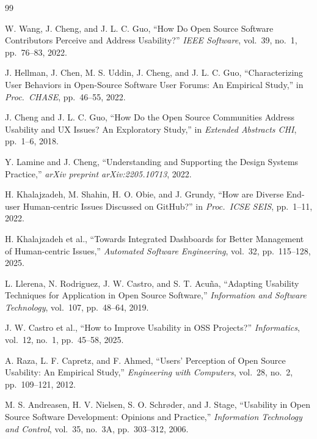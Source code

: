 \documentclass{article}
\begin{document}
\begin{thebibliography}{99}


W. Wang, J. Cheng, and J. L. C. Guo,
``How Do Open Source Software Contributors Perceive and Address Usability?''
\textit{IEEE Software}, vol.~39, no.~1, pp.~76--83, 2022.

J. Hellman, J. Chen, M. S. Uddin, J. Cheng, and J. L. C. Guo,
``Characterizing User Behaviors in Open-Source Software User Forums:
An Empirical Study,''
in \textit{Proc.\ CHASE}, pp.~46--55, 2022.

J. Cheng and J. L. C. Guo,
``How Do the Open Source Communities Address Usability and UX Issues?
An Exploratory Study,''
in \textit{Extended Abstracts CHI}, pp.~1--6, 2018.

Y. Lamine and J. Cheng,
``Understanding and Supporting the Design Systems Practice,''
\textit{arXiv preprint arXiv:2205.10713}, 2022.

H. Khalajzadeh, M. Shahin, H. O. Obie, and J. Grundy,
``How are Diverse End-user Human-centric Issues Discussed on GitHub?''
in \textit{Proc.\ ICSE SEIS}, pp.~1--11, 2022.

H. Khalajzadeh et al.,
``Towards Integrated Dashboards for Better Management of Human-centric Issues,''
\textit{Automated Software Engineering}, vol.~32, pp.~115--128, 2025.

L. Llerena, N. Rodriguez, J. W. Castro, and S. T. Acu\~{n}a,
``Adapting Usability Techniques for Application in Open Source Software,''
\textit{Information and Software Technology}, vol.~107, pp.~48--64, 2019.

J. W. Castro et al.,
``How to Improve Usability in OSS Projects?''
\textit{Informatics}, vol.~12, no.~1, pp.~45--58, 2025.

A. Raza, L. F. Capretz, and F. Ahmed,
``Users' Perception of Open Source Usability: An Empirical Study,''
\textit{Engineering with Computers}, vol.~28, no.~2, pp.~109--121, 2012.

M. S. Andreasen, H. V. Nielsen, S. O. Schr{\o}der, and J. Stage,
``Usability in Open Source Software Development: Opinions and Practice,''
\textit{Information Technology and Control}, vol.~35, no.~3A,
pp.~303--312, 2006.


\end{thebibliography}
\end{document}
